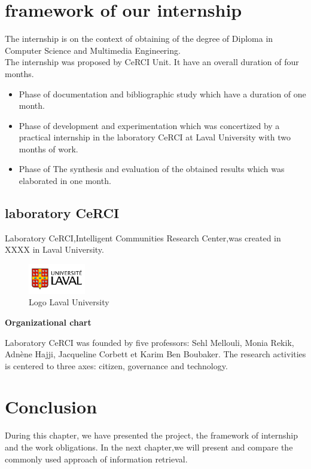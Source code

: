 \section{framework of our internship}
The internship is on the context of obtaining of the degree of Diploma in Computer Science and Multimedia Engineering.
\\
The internship was proposed by CeRCI Unit. It have an overall duration of four months. 
 \begin{itemize}
 \item Phase of documentation and bibliographic study which have a duration of one month.
 \item Phase of development and experimentation which was concertized by a practical internship in the laboratory CeRCI at  Laval University with two months of work.
 \item Phase of The synthesis and evaluation of the  obtained results which was elaborated in one month.
 \end{itemize} 
\subsection{laboratory CeRCI}
Laboratory CeRCI,Intelligent Communities Research Center,was created in XXXX in Laval University.
\begin{figure} [H]
\begin{center}
\includegraphics [width=2.5cm]{logo.png}
\caption{Logo Laval University}
\end{center}
\end{figure}
\textbf{Organizational chart}

Laboratory CeRCI was founded by five professors: Sehl Mellouli, Monia Rekik, Adnène Hajji, Jacqueline Corbett et Karim Ben Boubaker.
The research activities is centered  to three axes: citizen, governance and technology.  
\section{Conclusion}
During this chapter, we have presented the project, the framework of internship and the work obligations. In the next chapter,we will present and compare the commonly used approach  of information retrieval.

